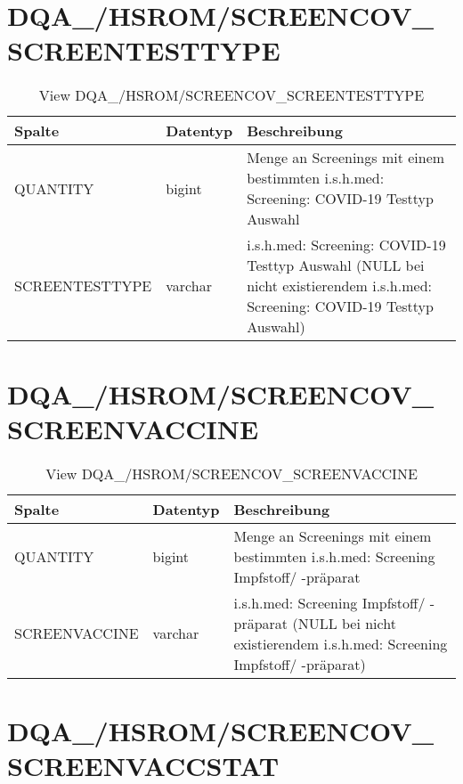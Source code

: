   \section{DQA\_/HSROM/SCREENCOV\_\\ SCREENTESTTYPE}

  \begin{table}[ht]
    \centering
    \caption{View DQA\_/HSROM/SCREENCOV\_SCREENTESTTYPE}
    \label{tab:dqa/hsrom/screencovscreentesttype}
    \begin{tabular}{||l|l|p{10cm}||}
      \hline
      Spalte & Datentyp & Beschreibung \\ [0.5ex] \hline \hline
      QUANTITY & bigint & Menge an Screenings mit einem bestimmten i.s.h.med: Screening: COVID-19 Testtyp Auswahl \\ \hline
      SCREENTESTTYPE & varchar & i.s.h.med: Screening: COVID-19 Testtyp Auswahl (NULL bei nicht existierendem i.s.h.med: Screening: COVID-19 Testtyp Auswahl)\\ \hline
    \end{tabular}
  \end{table}
 \clearpage
  \section{DQA\_/HSROM/SCREENCOV\_\\ SCREENVACCINE}

  \begin{table}[ht]
    \centering
    \caption{View DQA\_/HSROM/SCREENCOV\_SCREENVACCINE}
    \label{tab:dqa/hsrom/screencovscreenvaccine}
    \begin{tabular}{||l|l|p{10cm}||}
      \hline
      Spalte & Datentyp & Beschreibung \\ [0.5ex] \hline \hline
      QUANTITY & bigint & Menge an Screenings mit einem bestimmten i.s.h.med: Screening Impfstoff/ -präparat \\ \hline
      SCREENVACCINE & varchar & i.s.h.med: Screening Impfstoff/ -präparat (NULL bei nicht existierendem i.s.h.med: Screening Impfstoff/ -präparat)\\ \hline
    \end{tabular}
  \end{table}
 
  \section{DQA\_/HSROM/SCREENCOV\_\\ SCREENVACCSTAT}

